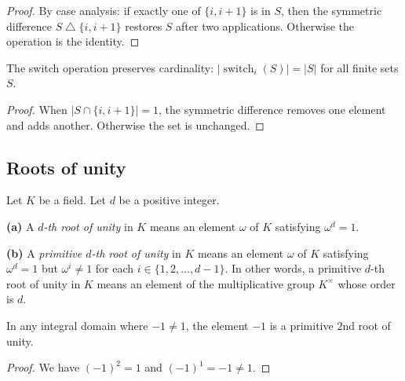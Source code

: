 \begin{proof}
\leanok
By case analysis: if exactly one of $\{i, i+1\}$ is in $S$, then the
symmetric difference $S \bigtriangleup \{i, i+1\}$ restores $S$ after
two applications. Otherwise the operation is the identity.
\end{proof}

\begin{lemma}
\label{lem.switch_card}
\leanhelper
\leanok
The switch operation preserves cardinality:
$|\operatorname{switch}_i(S)| = |S|$ for all finite sets $S$.
\end{lemma}

\begin{proof}
\leanok
When $|S \cap \{i, i+1\}| = 1$, the symmetric difference removes one
element and adds another. Otherwise the set is unchanged.
\end{proof}

\subsection{Roots of unity}

\begin{definition}
\label{def.root-of-unity.prim}
\leantarget
\leanok
Let $K$ be a field. Let $d$ be a positive integer.

\textbf{(a)} A \emph{$d$-th root of unity} in $K$ means an element
$\omega$ of $K$ satisfying $\omega^d = 1$.

\textbf{(b)} A \emph{primitive $d$-th root of unity} in $K$ means an
element $\omega$ of $K$ satisfying $\omega^d = 1$ but
$\omega^i \neq 1$ for each $i \in \{1, 2, \ldots, d-1\}$.
In other words, a primitive $d$-th root of unity in $K$ means an element
of the multiplicative group $K^{\times}$ whose order is $d$.
\end{definition}

\begin{lemma}
\label{lem.neg_one_isPrimitiveRoot_two}
\leanhelper
\leanok
In any integral domain where $-1 \neq 1$, the element $-1$ is a
primitive $2$nd root of unity.
\end{lemma}

\begin{proof}
\leanok
We have $(-1)^2 = 1$ and $(-1)^1 = -1 \neq 1$.
\end{proof}

